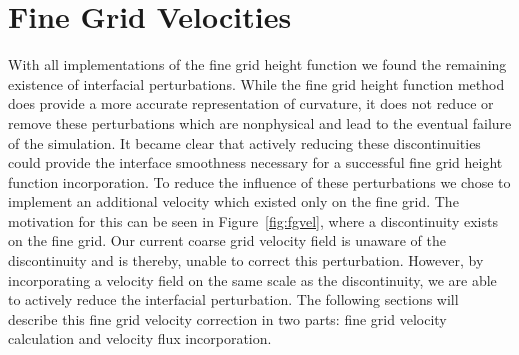 
\section{Fine Grid Velocities}
With all  implementations of the fine grid height function we found the remaining existence of interfacial perturbations. While the fine grid height function method does provide a more accurate representation of curvature, it does not reduce or remove these perturbations which are nonphysical and lead to the eventual failure of the simulation. It became clear that actively reducing these discontinuities could provide the interface smoothness necessary for a successful fine grid height function incorporation. To reduce the influence of these perturbations we chose to implement an additional velocity which existed only on the fine grid. The motivation for this can be seen in Figure~\ref{fig:fgvel}, where a discontinuity exists on the fine grid. Our current coarse grid velocity field is unaware of the discontinuity and is thereby, unable to correct this perturbation. However, by incorporating a velocity field on the same scale as the discontinuity, we are able to actively reduce the interfacial perturbation. The following sections will describe this fine grid velocity correction in two parts: fine grid velocity calculation and velocity flux incorporation.                          
